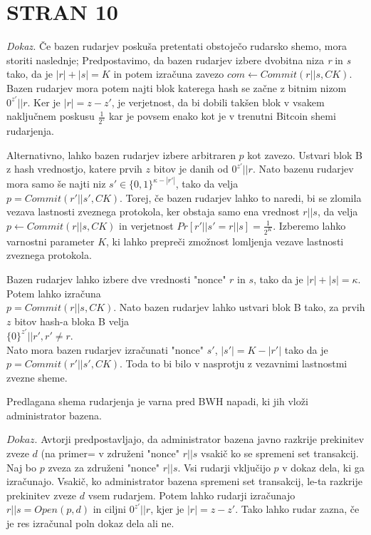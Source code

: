 \documentclass{acm_proc_article-sp}
\begin{document}
\section{STRAN 10}

\noindent \textit{Dokaz.} Če bazen rudarjev poskuša pretentati obstoječo rudarsko shemo, mora storiti naslednje; Predpostavimo, da bazen rudarjev izbere dvobitna niza \textit{r} in \textit{s} tako, da je \textit{$|r| + |s| = K$} in potem izračuna zavezo \textit{$com \leftarrow Commit(r||s, CK)$}. Bazen rudarjev mora potem najti blok katerega hash se začne z bitnim nizom \textit{$0^{z'}||r$}. Ker je \textit{$|r| = z - z'$}, je verjetnost, da bi dobili takšen blok v vsakem naključnem poskusu $\frac{1}{2^{z}}$ kar je povsem enako kot je v trenutni Bitcoin shemi rudarjenja. 

Alternativno, lahko bazen rudarjev izbere arbitraren \textit{$p$} kot zavezo. Ustvari blok B z hash vrednostjo, katere prvih \textit{$z$} bitov je danih od \textit{$0^{z'}||r$}. Nato bazenu rudarjev mora samo še najti niz  \textit{$s' \in \{0, 1\}^{\kappa-|r'|}$}, tako da velja \\ \textit{$p = Commit(r'||s',CK)$}. Torej, če bazen rudarjev lahko to naredi, bi se zlomila vezava lastnosti zveznega protokola, ker obstaja samo ena vrednost \textit{$r||s$}, da velja \textit{$p \leftarrow Commit(r||s, CK)$} in verjetnost \textit{$Pr [r'||s' = r||s] = \frac{1}{2^{K}}$}. Izberemo lahko varnostni parameter \textit{$K$}, ki lahko prepreči zmožnost lomljenja vezave lastnosti zveznega protokola.

Bazen rudarjev lahko izbere dve vrednosti "nonce" \textit{$r$} in \textit{$s$}, tako da je \textit{$|r| + |s| = \kappa$}. Potem lahko izračuna \\ \textit{$p = Commit(r||s,CK)$}. Nato bazen rudarjev lahko ustvari blok B tako, za  prvih \textit{$z$} bitov hash-a bloka B velja \\ \textit{$\{0\}^{z'}||r',r' \neq r$}.\\ Nato mora bazen rudarjev izračunati "nonce" \textit{$s'$}, \textit{$|s'| = K - |r'|$} tako da je \textit{$p = Commit(r'||s',CK)$}. Toda to bi bilo v nasprotju z vezavnimi lastnostmi zvezne sheme.

\begin{lema}\label{lema4}
	Predlagana shema rudarjenja je varna pred BWH napadi, ki jih vloži administrator bazena.
\end{lema}

\noindent\textit{$Dokaz$}. Avtorji predpostavljajo, da administrator bazena javno razkrije prekinitev zveze \textit{$d$} (na primer= v združeni "nonce" \textit{$r||s$} vsakič ko se spremeni set transakcij. Naj bo \textit{$p$} zveza za združeni "nonce" \textit{$r||s$}. Vsi rudarji vključijo \textit{$p$} v dokaz dela, ki ga izračunajo. Vsakič, ko administrator bazena spremeni set transakcij, le-ta razkrije prekinitev zveze \textit{$d$} vsem rudarjem. Potem lahko rudarji izračunajo \textit{$r||s = Open(p,d)$} in ciljni \textit{$0^{z'}||r$}, kjer je \textit{$|r| = z -z'$}. Tako lahko rudar zazna, če je res izračunal poln dokaz dela ali ne.
\end{document}
